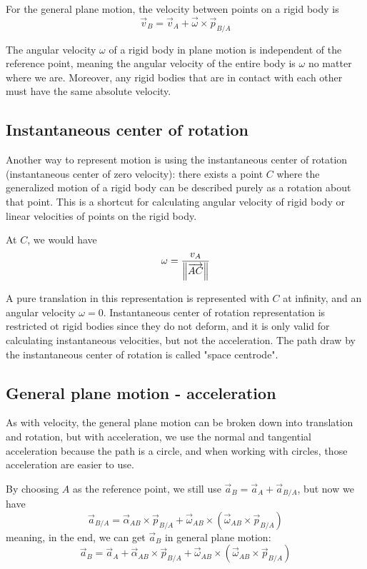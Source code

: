 \documentclass[10pt, twocolumn]{article}
\begin{document}
For the general plane motion, the velocity between points on a rigid body is
\[
  \vec{v}_B = \vec{v}_A + \vec{\omega} \times \vec{p}_{B/A}
\]

The angular velocity \(\omega\) of a rigid body in plane motion is independent of the reference point, meaning the angular velocity of the entire body is \(\omega\) no matter where we are.
Moreover, any rigid bodies that are in contact with each other must have the same absolute velocity.


\subsection{Instantaneous center of rotation}
Another way to represent motion is using the instantaneous center of rotation (instantaneous center of zero velocity): there exists a point \(C\) where the generalized motion of a rigid body can be described purely as a rotation about that point.
This is a shortcut for calculating angular velocity of rigid body or linear velocities of points on the rigid body.

At \(C\), we would have
\[
  \omega = \frac{v_A}{\left\| \overrightarrow{AC} \right\|}
\]

A pure translation in this representation is represented with \(C\) at infinity, and an angular velocity \(\omega = 0\).
Instantaneous center of rotation representation is restricted ot rigid bodies since they do not deform, and it is only valid for calculating instantaneous velocities, but not the acceleration.
The path draw by the instantaneous center of rotation is called "space centrode".


\subsection{General plane motion - acceleration}
As with velocity, the general plane motion can be broken down into translation and rotation, but with acceleration, we use the normal and tangential acceleration because the path is a circle, and when working with circles, those acceleration are easier to use.

By choosing \(A\) as the reference point, we still use \(\vec{a}_B = \vec{a}_A + \vec{a}_{B/A}\), but now we have
\[
  \vec{a}_{B/A} = \vec{\alpha}_{AB} \times \vec{p}_{B/A} + \vec{\omega}_{AB} \times \left( \vec{\omega}_{AB} \times \vec{p}_{B/A} \right)
\]
meaning, in the end, we can get \(\vec{a}_B\) in general plane motion:
\[
  \vec{a}_B = \vec{a}_A + \vec{\alpha}_{AB} \times \vec{p}_{B/A} + \vec{\omega}_{AB} \times \left( \vec{\omega}_{AB} \times \vec{p}_{B/A} \right)
\]
\end{document}
